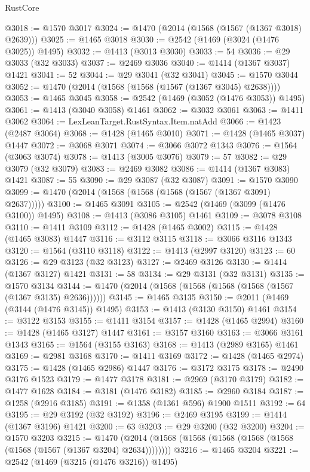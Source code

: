 \begin{lexlean}{RustCore}
\begin{coremodule}
@3018 := @1570 @3017
@3024 := @1470 (@2014 (@1568 (@1567 (@1367 @3018) @2639)))
@3025 := @1465 @3018
@3030 := @2542 (@1469 (@3024 (@1476 @3025)) @1495)
@3032 := @1413 (@3013 @3030)
@3033 := 54
@3036 := @29 @3033 (@32 @3033)
@3037 := @2469 @3036
@3040 := @1414 (@1367 @3037) @1421
@3041 := 52
@3044 := @29 @3041 (@32 @3041)
@3045 := @1570 @3044
@3052 := @1470 (@2014 (@1568 (@1568 (@1567 (@1367 @3045) @2638))))
@3053 := @1465 @3045
@3058 := @2542 (@1469 (@3052 (@1476 @3053)) @1495)
@3061 := @1413 (@3040 @3058) @1461
@3062 := @3032 @3061
@3063 := @1411 @3062
@3064 := LexLeanTarget.RustSyntax.Item.natAdd
@3066 := @1423 (@2487 @3064)
@3068 := @1428 (@1465 @3010)
@3071 := @1428 (@1465 @3037) @1447
@3072 := @3068 @3071
@3074 := @3066 @3072 @1343
@3076 := @1564 (@3063 @3074)
@3078 := @1413 (@3005 @3076)
@3079 := 57
@3082 := @29 @3079 (@32 @3079)
@3083 := @2469 @3082
@3086 := @1414 (@1367 @3083) @1421
@3087 := 55
@3090 := @29 @3087 (@32 @3087)
@3091 := @1570 @3090
@3099 := @1470 (@2014 (@1568 (@1568 (@1568 (@1567 (@1367 @3091) @2637)))))
@3100 := @1465 @3091
@3105 := @2542 (@1469 (@3099 (@1476 @3100)) @1495)
@3108 := @1413 (@3086 @3105) @1461
@3109 := @3078 @3108
@3110 := @1411 @3109
@3112 := @1428 (@1465 @3002)
@3115 := @1428 (@1465 @3083) @1447
@3116 := @3112 @3115
@3118 := @3066 @3116 @1343
@3120 := @1564 (@3110 @3118)
@3122 := @1413 (@2997 @3120)
@3123 := 60
@3126 := @29 @3123 (@32 @3123)
@3127 := @2469 @3126
@3130 := @1414 (@1367 @3127) @1421
@3131 := 58
@3134 := @29 @3131 (@32 @3131)
@3135 := @1570 @3134
@3144 := @1470 (@2014 (@1568 (@1568 (@1568 (@1568 (@1567 (@1367 @3135) @2636))))))
@3145 := @1465 @3135
@3150 := @2011 (@1469 (@3144 (@1476 @3145)) @1495)
@3153 := @1413 (@3130 @3150) @1461
@3154 := @3122 @3153
@3155 := @1411 @3154
@3157 := @1428 (@1465 @2994)
@3160 := @1428 (@1465 @3127) @1447
@3161 := @3157 @3160
@3163 := @3066 @3161 @1343
@3165 := @1564 (@3155 @3163)
@3168 := @1413 (@2989 @3165) @1461
@3169 := @2981 @3168
@3170 := @1411 @3169
@3172 := @1428 (@1465 @2974)
@3175 := @1428 (@1465 @2986) @1447
@3176 := @3172 @3175
@3178 := @2490 @3176 @1523
@3179 := @1477 @3178
@3181 := @2969 (@3170 @3179)
@3182 := @1477 @1628
@3184 := @3181 (@1476 @3182)
@3185 := @2960 @3184
@3187 := @1258 (@2916 @3185)
@3191 := @1358 (@1361 @596) @1900 @1511
@3192 := 64
@3195 := @29 @3192 (@32 @3192)
@3196 := @2469 @3195
@3199 := @1414 (@1367 @3196) @1421
@3200 := 63
@3203 := @29 @3200 (@32 @3200)
@3204 := @1570 @3203
@3215 := @1470 (@2014 (@1568 (@1568 (@1568 (@1568 (@1568 (@1568 (@1567 (@1367 @3204) @2634))))))))
@3216 := @1465 @3204
@3221 := @2542 (@1469 (@3215 (@1476 @3216)) @1495)

\end{coremodule}
\end{lexlean}
